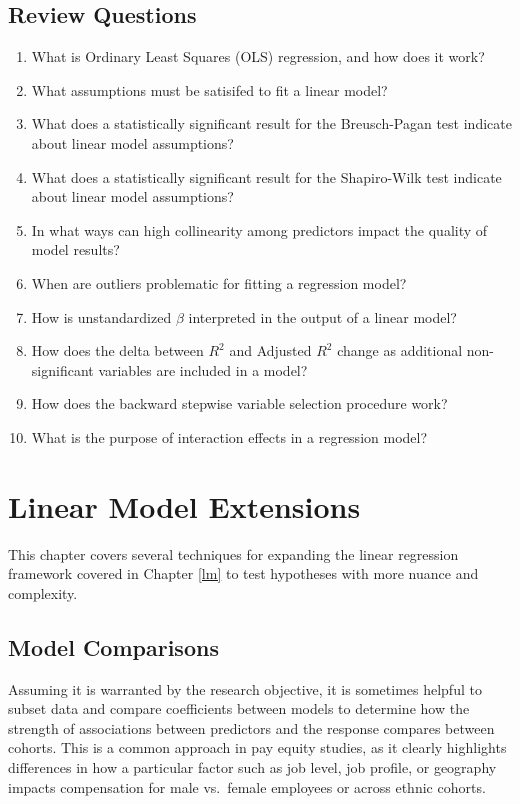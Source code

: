 \documentclass[
]{book}
\begin{document}
\hypertarget{review-questions-8}{%
\section{Review Questions}\label{review-questions-8}}

\begin{enumerate}
\def\labelenumi{\arabic{enumi}.}
\item
  What is Ordinary Least Squares (OLS) regression, and how does it work?
\item
  What assumptions must be satisifed to fit a linear model?
\item
  What does a statistically significant result for the Breusch-Pagan test indicate about linear model assumptions?
\item
  What does a statistically significant result for the Shapiro-Wilk test indicate about linear model assumptions?
\item
  In what ways can high collinearity among predictors impact the quality of model results?
\item
  When are outliers problematic for fitting a regression model?
\item
  How is unstandardized \(\beta\) interpreted in the output of a linear model?
\item
  How does the delta between \(R^2\) and Adjusted \(R^2\) change as additional non-significant variables are included in a model?
\item
  How does the backward stepwise variable selection procedure work?
\item
  What is the purpose of interaction effects in a regression model?
\end{enumerate}

\hypertarget{lme}{%
\chapter{Linear Model Extensions}\label{lme}}

This chapter covers several techniques for expanding the linear regression framework covered in Chapter \ref{lm} to test hypotheses with more nuance and complexity.

\hypertarget{model-comparisons}{%
\section{Model Comparisons}\label{model-comparisons}}

Assuming it is warranted by the research objective, it is sometimes helpful to subset data and compare coefficients between models to determine how the strength of associations between predictors and the response compares between cohorts. This is a common approach in pay equity studies, as it clearly highlights differences in how a particular factor such as job level, job profile, or geography impacts compensation for male vs.~female employees or across ethnic cohorts.
\end{document}
